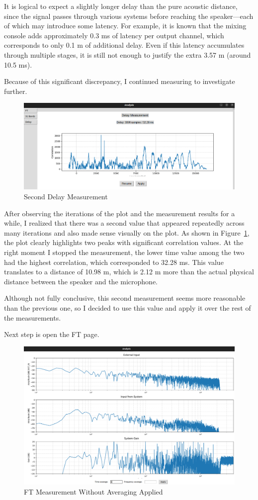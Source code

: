 It is logical to expect a slightly longer delay than the pure acoustic distance, since the signal passes through various systems before reaching the speaker—each of which may introduce some latency. For example, it is known that the mixing console adds approximately 0.3 ms of latency per output channel, which corresponds to only 0.1 m of additional delay. Even if this latency accumulates through multiple stages, it is still not enough to justify the extra 3.57 m (around 10.5 ms).

Because of this significant discrepancy, I continued measuring to investigate further.

\begin{figure}[H]
	\centering
	\includegraphics[width=0.8
	\linewidth]{Figures/Coro_delay_2.png}
	\caption{Second Delay Measurement}
	\label{fig:Coro_delay2}
\end{figure}

After observing the iterations of the plot and the measurement results for a while, I realized that there was a second value that appeared repeatedly across many iterations and also made sense visually on the plot. As shown in Figure~\ref{fig:Coro_delay2}, the plot clearly highlights two peaks with significant correlation values. At the right moment I stopped the measurement, the lower time value among the two had the highest correlation, which corresponded to 32.28 ms. This value translates to a distance of 10.98 m, which is 2.12 m more than the actual physical distance between the speaker and the microphone.

Although not fully conclusive, this second measurement seems more reasonable than the previous one, so I decided to use this value and apply it over the rest of the measurements.

Next step is open the FT page.

\begin{figure}[H]
	\centering
	\includegraphics[width=0.8
	\linewidth]{Figures/Coro_FT_NO_av.png}
	\caption{FT Measurement Without Averaging Applied}
	\label{fig:Coro_FT_no_av}
\end{figure}

